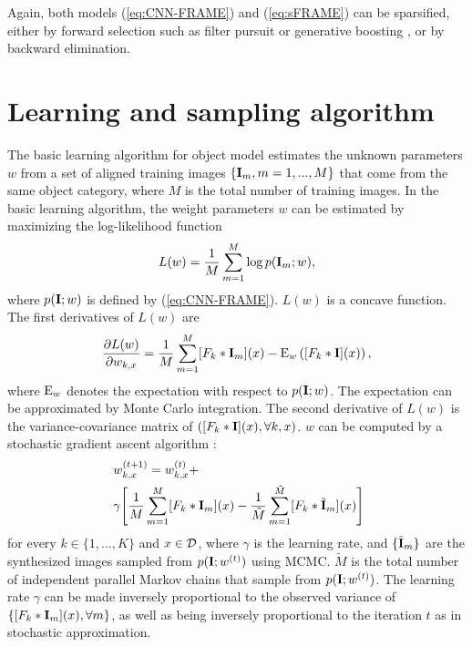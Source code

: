 \documentclass[letterpaper]{article}
\def\E{{\rm E}}
\def\I{{\bf I}}
\def\tI{\tilde{\bf I}}
\begin{document}
Again, both models (\ref{eq:CNN-FRAME}) and (\ref{eq:sFRAME}) can be sparsified, either by forward selection such as filter pursuit \citep{zhu1997minimax} or generative boosting  \citep{xie2015boosting}, or by backward elimination. 


\section{Learning and sampling algorithm} 

The basic learning algorithm for object model estimates the unknown parameters $w$ from a set of aligned training images $\{\I_m, m = 1, ..., M\}$ that come from the same object category,  where $M$ is the total number of training images.  In the basic learning algorithm, the weight parameters $w$ can be estimated by maximizing the  log-likelihood function
\begin{equation}
L(w) = \frac{1}{M} \sum_{m=1}^{M} \log p(\I_m; w), \label{eq:logl0}
\end{equation}
where $p(\I; w)$ is defined by (\ref{eq:CNN-FRAME}). $L(w)$ is a concave function. The first derivatives of $L(w)$ are 
\begin{equation}
\frac{\partial L(w)}{\partial w_{k, x}} = \frac{1}{M} \sum_{m=1}^{M} [F_k*\I_m](x) - \E_{w}\left([F_{k}*\I](x) \right), 
\label{eq:gradient}
\end{equation}
where $\E_{w}$ denotes the expectation with respect to $p(\I; w)$. The expectation can be approximated by Monte Carlo integration. The second derivative of $L(w)$ is the variance-covariance matrix of $([F_k*\I](x), \forall k, x)$. 
 $w$ can be computed by a stochastic gradient ascent algorithm \citep{younes1999convergence}:
\begin{equation}
\begin{aligned}
&w^{(t+1)}_{k, x} = w^{(t)}_{k, x} + 
\\\ & \gamma \Bigg[\frac{1}{M} \sum_{m=1}^{M} [F_k *\I_m](x)
               - \frac{1}{\tilde{M}} \sum_{m=1}^{\tilde{M}} [F_k *\tI_m](x)\Bigg]
\end{aligned}
\label{eq:learning}
\end{equation}   
for every $k \in \{1, ..., K\}$ and $x \in {\cal D}$, where $\gamma$ is the learning rate, and $\{\tI_m\}$ are the synthesized images sampled from $p(\I; w^{(t)})$ using MCMC. $\tilde{M}$ is the total number of independent parallel Markov chains that sample from $p(\I; w^{(t)})$.  The learning rate $\gamma$ can be made inversely proportional to the observed variance of $\{[F_k*\I_m](x), \forall m\}$, as well as being inversely proportional to the iteration $t$ as in stochastic approximation. 
\end{document}
